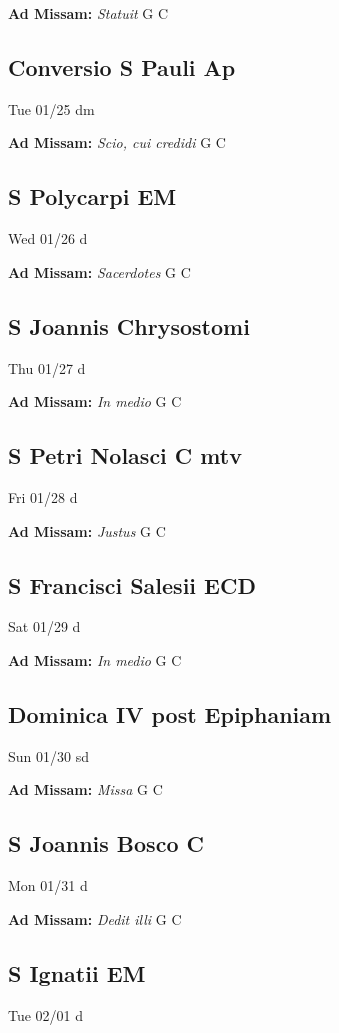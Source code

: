 \documentclass[letterpaper, 10pt, twocolumn]{article}
\begin{document}
\textbf{Ad Missam:} \textit{Statuit} G C 

\subsection*{Conversio S Pauli Ap}Tue 01/25 dm

\textbf{Ad Missam:} \textit{Scio, cui credidi} G C 

\subsection*{S Polycarpi EM}Wed 01/26 d

\textbf{Ad Missam:} \textit{Sacerdotes} G C 

\subsection*{S Joannis Chrysostomi}Thu 01/27 d

\textbf{Ad Missam:} \textit{In medio} G C 

\subsection*{S Petri Nolasci C mtv}Fri 01/28 d

\textbf{Ad Missam:} \textit{Justus} G C 

\subsection*{S Francisci Salesii ECD}Sat 01/29 d

\textbf{Ad Missam:} \textit{In medio} G C 

\subsection*{Dominica IV post Epiphaniam}Sun 01/30 sd

\textbf{Ad Missam:} \textit{Missa} G C 

\subsection*{S Joannis Bosco C}Mon 01/31 d

\textbf{Ad Missam:} \textit{Dedit illi} G C 

\subsection*{S Ignatii EM}Tue 02/01 d
\end{document}
